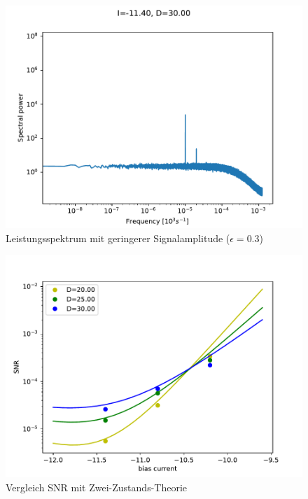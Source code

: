 \documentclass[12pt,a4paper]{article}
\begin{document}
\begin{figure}[H]
	\centering
	\includegraphics[scale=1]{spekpoi4dd30.pdf}\caption{Leistungsspektrum mit geringerer Signalamplitude ($\epsilon=0.3$)}
	\label{spekpoi30}
\end{figure}
\begin{figure}[H]
	\centering
	\includegraphics[scale=1]{snrinzelpoi4d3.pdf}\caption{Vergleich SNR mit Zwei-Zustands-Theorie}
	\label{snrpoi4d}
\end{figure}
\end{document}
